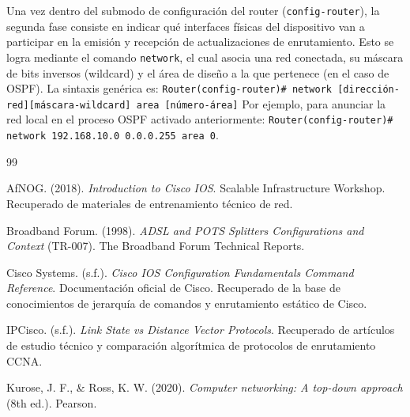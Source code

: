 \documentclass[a4paper,12pt]{article}
\begin{document}
Una vez dentro del submodo de configuración del router (\texttt{config-router}), la segunda fase consiste en indicar qué interfaces físicas del dispositivo van a participar en la emisión y recepción de actualizaciones de enrutamiento. Esto se logra mediante el comando \texttt{network}, el cual asocia una red conectada, su máscara de bits inversos (wildcard) y el área de diseño a la que pertenece (en el caso de OSPF). La sintaxis genérica es:
\texttt{Router(config-router)\# network [dirección-red][máscara-wildcard] area [número-área]}
Por ejemplo, para anunciar la red local en el proceso OSPF activado anteriormente: \texttt{Router(config-router)\# network 192.168.10.0 0.0.0.255 area 0}.

\begin{thebibliography}{99}

AfNOG. (2018). \textit{Introduction to Cisco IOS}. Scalable Infrastructure Workshop. Recuperado de materiales de entrenamiento técnico de red.

Broadband Forum. (1998). \textit{ADSL and POTS Splitters Configurations and Context} (TR-007). The Broadband Forum Technical Reports.

Cisco Systems. (s.f.). \textit{Cisco IOS Configuration Fundamentals Command Reference}. Documentación oficial de Cisco. Recuperado de la base de conocimientos de jerarquía de comandos y enrutamiento estático de Cisco.

IPCisco. (s.f.). \textit{Link State vs Distance Vector Protocols}. Recuperado de artículos de estudio técnico y comparación algorítmica de protocolos de enrutamiento CCNA.

Kurose, J. F., \& Ross, K. W. (2020). \textit{Computer networking: A top-down approach} (8th ed.). Pearson.

\end{thebibliography}
\end{document}
